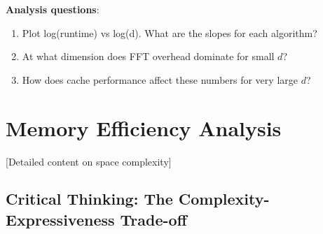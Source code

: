\begin{coding}
\textbf{Analysis questions}:
\begin{enumerate}
\item Plot log(runtime) vs log(d). What are the slopes for each algorithm?
\item At what dimension does FFT overhead dominate for small $d$?
\item How does cache performance affect these numbers for very large $d$?
\end{enumerate}
\end{coding}

\section{Memory Efficiency Analysis}

[Detailed content on space complexity]

\subsection{Critical Thinking: The Complexity-Expressiveness Trade-off}

